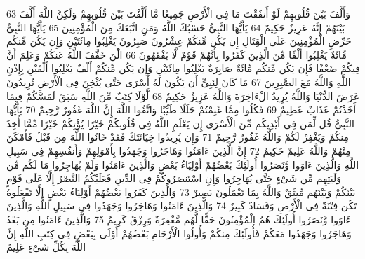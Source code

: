 \documentclass[20pt,a4paper]{article}
\begin{document}
{\tiny\colorbox{cl_aya}{63}} وَأَلَّفَ بَيْنَ قُلُوبِهِمْ لَوْ أَنفَقْتَ مَا فِى الْأَرْضِ جَمِيعًا مَّا أَلَّفْتَ بَيْنَ قُلُوبِهِمْ وَلَكِنَّ اللَّهَ أَلَّفَ بَيْنَهُمْ إِنَّهُ عَزِيزٌ حَكِيمٌ
{\tiny\colorbox{cl_aya}{64}} يَأَيُّهَا النَّبِىُّ حَسْبُكَ اللَّهُ وَمَنِ اتَّبَعَكَ مِنَ الْمُؤْمِنِينَ
{\tiny\colorbox{cl_aya}{65}} يَأَيُّهَا النَّبِىُّ حَرِّضِ الْمُؤْمِنِينَ عَلَى الْقِتَالِ إِن يَكُن مِّنكُمْ عِشْرُونَ صَبِرُونَ يَغْلِبُوا مِائَتَيْنِ وَإِن يَكُن مِّنكُم مِّائَةٌ يَغْلِبُوا أَلْفًا مِّنَ الَّذِينَ كَفَرُوا بِأَنَّهُمْ قَوْمٌ لَّا يَفْقَهُونَ
{\tiny\colorbox{cl_aya}{66}} الَْٔنَ خَفَّفَ اللَّهُ عَنكُمْ وَعَلِمَ أَنَّ فِيكُمْ ضَعْفًا فَإِن يَكُن مِّنكُم مِّائَةٌ صَابِرَةٌ يَغْلِبُوا مِائَتَيْنِ وَإِن يَكُن مِّنكُمْ أَلْفٌ يَغْلِبُوا أَلْفَيْنِ بِإِذْنِ اللَّهِ وَاللَّهُ مَعَ الصَّبِرِينَ
{\tiny\colorbox{cl_aya}{67}} مَا كَانَ لِنَبِىٍّ أَن يَكُونَ لَهُ أَسْرَى حَتَّى يُثْخِنَ فِى الْأَرْضِ تُرِيدُونَ عَرَضَ الدُّنْيَا وَاللَّهُ يُرِيدُ الْءَاخِرَةَ وَاللَّهُ عَزِيزٌ حَكِيمٌ
{\tiny\colorbox{cl_aya}{68}} لَّوْلَا كِتَبٌ مِّنَ اللَّهِ سَبَقَ لَمَسَّكُمْ فِيمَا أَخَذْتُمْ عَذَابٌ عَظِيمٌ
{\tiny\colorbox{cl_aya}{69}} فَكُلُوا مِمَّا غَنِمْتُمْ حَلَلًا طَيِّبًا وَاتَّقُوا اللَّهَ إِنَّ اللَّهَ غَفُورٌ رَّحِيمٌ
{\tiny\colorbox{cl_aya}{70}} يَأَيُّهَا النَّبِىُّ قُل لِّمَن فِى أَيْدِيكُم مِّنَ الْأَسْرَى إِن يَعْلَمِ اللَّهُ فِى قُلُوبِكُمْ خَيْرًا يُؤْتِكُمْ خَيْرًا مِّمَّا أُخِذَ مِنكُمْ وَيَغْفِرْ لَكُمْ وَاللَّهُ غَفُورٌ رَّحِيمٌ
{\tiny\colorbox{cl_aya}{71}} وَإِن يُرِيدُوا خِيَانَتَكَ فَقَدْ خَانُوا اللَّهَ مِن قَبْلُ فَأَمْكَنَ مِنْهُمْ وَاللَّهُ عَلِيمٌ حَكِيمٌ
{\tiny\colorbox{cl_aya}{72}} إِنَّ الَّذِينَ ءَامَنُوا وَهَاجَرُوا وَجَهَدُوا بِأَمْوَلِهِمْ وَأَنفُسِهِمْ فِى سَبِيلِ اللَّهِ وَالَّذِينَ ءَاوَوا وَّنَصَرُوا أُولَئِكَ بَعْضُهُمْ أَوْلِيَاءُ بَعْضٍ وَالَّذِينَ ءَامَنُوا وَلَمْ يُهَاجِرُوا مَا لَكُم مِّن وَلَيَتِهِم مِّن شَىْءٍ حَتَّى يُهَاجِرُوا وَإِنِ اسْتَنصَرُوكُمْ فِى الدِّينِ فَعَلَيْكُمُ النَّصْرُ إِلَّا عَلَى قَوْمٍ بَيْنَكُمْ وَبَيْنَهُم مِّيثَقٌ وَاللَّهُ بِمَا تَعْمَلُونَ بَصِيرٌ
{\tiny\colorbox{cl_aya}{73}} وَالَّذِينَ كَفَرُوا بَعْضُهُمْ أَوْلِيَاءُ بَعْضٍ إِلَّا تَفْعَلُوهُ تَكُن فِتْنَةٌ فِى الْأَرْضِ وَفَسَادٌ كَبِيرٌ
{\tiny\colorbox{cl_aya}{74}} وَالَّذِينَ ءَامَنُوا وَهَاجَرُوا وَجَهَدُوا فِى سَبِيلِ اللَّهِ وَالَّذِينَ ءَاوَوا وَّنَصَرُوا أُولَئِكَ هُمُ الْمُؤْمِنُونَ حَقًّا لَّهُم مَّغْفِرَةٌ وَرِزْقٌ كَرِيمٌ
{\tiny\colorbox{cl_aya}{75}} وَالَّذِينَ ءَامَنُوا مِن بَعْدُ وَهَاجَرُوا وَجَهَدُوا مَعَكُمْ فَأُولَئِكَ مِنكُمْ وَأُولُوا الْأَرْحَامِ بَعْضُهُمْ أَوْلَى بِبَعْضٍ فِى كِتَبِ اللَّهِ إِنَّ اللَّهَ بِكُلِّ شَىْءٍ عَلِيمٌ
\end{document}
